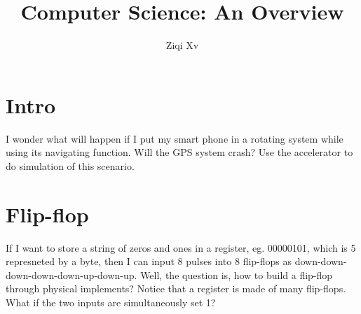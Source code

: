 \documentclass{article}
\title{Computer Science: An Overview}
\author{Ziqi Xv}
\begin{document}
\maketitle

\section{Intro}
I wonder what will happen if I put my smart phone in a rotating system while using its navigating function. Will the GPS system crash? Use the accelerator to do simulation of this scenario.

\section{Flip-flop}
If I want to store a string of zeros and ones in a register, eg. 00000101, which is 5 represneted by a byte, then I can input 8 pulses into 8 flip-flops as down-down-down-down-down-up-down-up. Well, the question is, how to build a flip-flop through physical implements? Notice that a register is made of many flip-flops.\\
What if the two inputs are simultaneously set 1?
\end{document}
